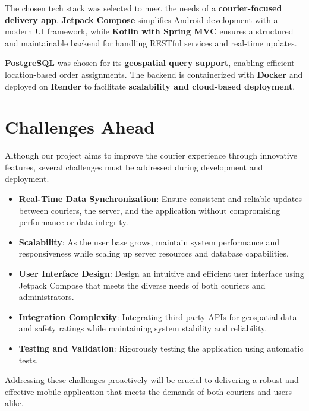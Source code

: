 \documentclass[a4paper,twoside,11pt]{article}
\begin{document}
{The chosen tech stack was selected to meet the needs of a \textbf{courier-focused delivery app}. \textbf{Jetpack Compose} simplifies Android development with a modern UI framework, while \textbf{Kotlin with Spring MVC} ensures a structured and maintainable backend for handling RESTful services and real-time updates.  

\vspace{2mm}

\textbf{PostgreSQL} was chosen for its \textbf{geospatial query support}, enabling efficient location-based order assignments. The backend is containerized with \textbf{Docker} and deployed on \textbf{Render} to facilitate \textbf{scalability and cloud-based deployment}.  

\section*{Challenges Ahead}

Although our project aims to improve the courier experience through innovative features, several challenges must be addressed during development and deployment.

\begin{itemize}
\item \textbf{Real-Time Data Synchronization}: Ensure consistent and reliable updates between couriers, the server, and the application without compromising performance or data integrity.

\item \textbf{Scalability}: As the user base grows, maintain system performance and responsiveness while scaling up server resources and database capabilities.

\item \textbf{User Interface Design}: Design an intuitive and efficient user interface using Jetpack Compose that meets the diverse needs of both couriers and administrators.

\item \textbf{Integration Complexity}: Integrating third-party APIs for geospatial data and safety ratings while maintaining system stability and reliability.

\item \textbf{Testing and Validation}: Rigorously testing the application using automatic tests.
\end{itemize}

Addressing these challenges proactively will be crucial to delivering a robust and effective mobile application that meets the demands of both couriers and users alike.

}
\end{document}
